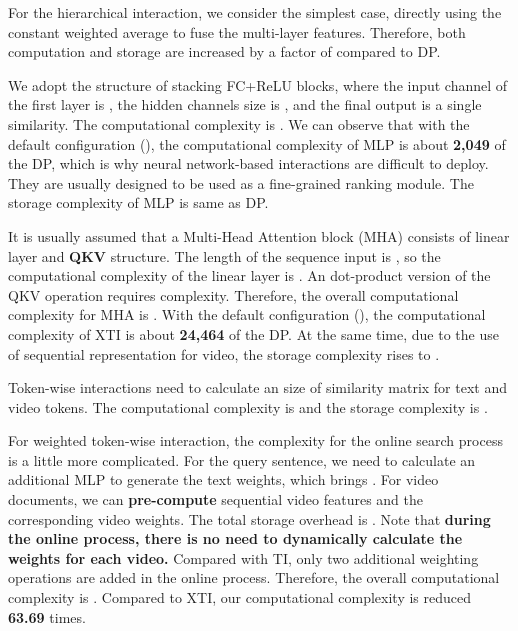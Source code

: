 \documentclass[runningheads]{llncs}
\begin{document}
For the hierarchical interaction, we consider the simplest case, directly using the constant weighted average to fuse the multi-layer features.
Therefore, both computation and storage are increased by a factor of  compared to DP.

We adopt the structure of stacking  FC+ReLU blocks, where the input channel of the first layer is , the hidden channels size is , and the final output is a single similarity.
The computational complexity is  .
We can observe that with the default configuration (), the computational complexity of MLP is about \textbf{2,049} of the DP, which is why neural network-based interactions are difficult to deploy. 
They are usually designed to be used as a fine-grained ranking module.
The storage complexity of MLP is same as DP.

It is usually assumed that a Multi-Head Attention block (MHA) consists of linear layer and \textbf{QKV} structure. The length of the sequence input is , so the computational complexity of the linear layer is .
An dot-product version of the QKV operation requires  complexity.
Therefore, the overall computational complexity for  MHA is .
With the default configuration (), the computational complexity of XTI  is about \textbf{24,464} of the DP.
At the same time, due to the use of sequential representation for video, the storage complexity rises to .


Token-wise interactions need to calculate an  size of similarity matrix for text and video tokens.
The computational complexity is  and the storage complexity is .

For weighted token-wise interaction, the complexity for the online search process is a little more complicated.
For the query sentence, we need to calculate an additional MLP to generate the text weights, which brings .
For video documents, we can \textbf{pre-compute} sequential video features and the corresponding video weights.
The total storage overhead is .
Note that \textbf{during the online process, there is no need to dynamically calculate the weights for each video.}
Compared with TI, only two additional weighting operations are added in the online process. Therefore, the overall computational complexity is .
Compared to XTI, our computational complexity is reduced \textbf{63.69} times.
\end{document}
